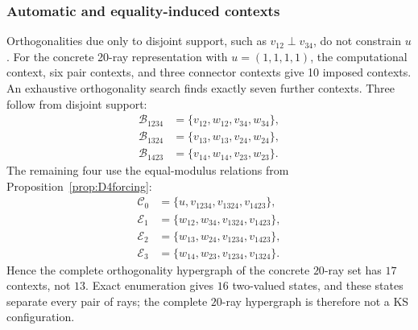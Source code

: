 \documentclass[%
  reprint,
  superscriptaddress,
  showpacs,
  showkeys,
  amsmath,amssymb,
  pra,
  longbibliography,
  floatfix,
  x11names
]{revtex4-2}
\newenvironment{revision}{\begingroup\color{revisionblue}}{\endgroup}
\begin{document}
\begin{revision}
\subsubsection{Automatic and equality-induced contexts}
Orthogonalities due only to disjoint support, such as $v_{12}\perp v_{34}$, do not constrain $u$.  For the concrete 20-ray representation with $u=(1,1,1,1)$, the computational context, six pair contexts, and three connector contexts give 10 imposed contexts.  An exhaustive orthogonality search finds exactly seven further contexts.  Three follow from disjoint support:
\begin{align*}
\mathcal{B}_{1234}&=\{v_{12},w_{12},v_{34},w_{34}\},\\
\mathcal{B}_{1324}&=\{v_{13},w_{13},v_{24},w_{24}\},\\
\mathcal{B}_{1423}&=\{v_{14},w_{14},v_{23},w_{23}\}.
\end{align*}
The remaining four use the equal-modulus relations from Proposition~\ref{prop:D4forcing}:
\begin{align*}
\mathcal{C}_0&=\{u,v_{1234},v_{1324},v_{1423}\},\\
\mathcal{E}_1&=\{w_{12},w_{34},v_{1324},v_{1423}\},\\
\mathcal{E}_2&=\{w_{13},w_{24},v_{1234},v_{1423}\},\\
\mathcal{E}_3&=\{w_{14},w_{23},v_{1234},v_{1324}\}.
\end{align*}
Hence the complete orthogonality hypergraph of the concrete $20$-ray set has $17$ contexts, not $13$.  Exact enumeration gives $16$ two-valued states, and these states separate every pair of rays; the complete $20$-ray hypergraph is therefore not a KS configuration.
\end{revision}
\end{document}
